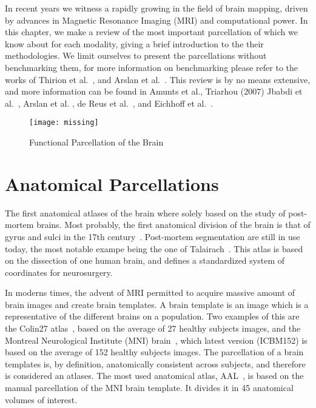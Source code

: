 In recent years we witness a rapidly growing in the field
of brain mapping, driven by advances in Magnetic Resonance Imaging (MRI) and
computational power. In this chapter, we make a review of the most important
parcellation of which we know about for each modality, giving a brief introduction
to the their methodologies. We limit ourselves to present the parcellations without
benchmarking them, for more information on benchmarking please refer to the
works of Thirion et al.~\cite{Thirion2014}, and Arslan et al.~\cite{Arslan2018}.
This review is by no means extensive, and more information can be found in
Amunts et al.\cite{Amunts2007}, Triarhou (2007)\cite{Triarhou2007} 
Jbabdi et al.~\cite{Jbabdi2013}, Arslan et al. \cite{Arslan2018},
de Reus et al.~\cite{DeReus2013}, and Eichhoff et al.~\cite{Eickhoff2015}.
 
\begin{figure*}[t!]
    \texttt{[image: missing]}
    \caption{Functional Parcellation of the Brain}
    \label{fig:brain_function}
\end{figure*}

\section{Anatomical Parcellations}
\label{sec:anatomical}
The first anatomical atlases of the brain where solely based on the study of
post-mortem brains. Most probably, the first anatomical division of the brain
is that of gyrus and sulci in the 17th century~\cite{Collice2008}. Post-mortem
segmentation are still in use today, the most notable exampe being the one
of Talairach~\cite{Talairach1988}. This atlas is based on the dissection of one
human brain, and defines a
standardized system of coordinates for neurosurgery.

In moderns times, the advent of MRI permitted to acquire massive amount
of brain images and create brain templates. A brain template is an image
which is a representative of the different brains on a population. Two
examples of this are the Colin27 atlas~\cite{Collins1998}, based on the average
of 27 healthy subjects images, and the Montreal Neurological Institute (MNI) brain~\cite{Holmes1998},
which latest version (ICBM152) is based on the average of 152 healthy subjects images.
The parcellation of a brain templates is, by definition, anatomically
consistent across subjects, and therefore is considered an atlases. The
most used anatomical atlas, AAL~\cite{Landeau2002}, is based on the manual
parcellation of the MNI brain template. It divides it in 45 anatomical
volumes of interest.


